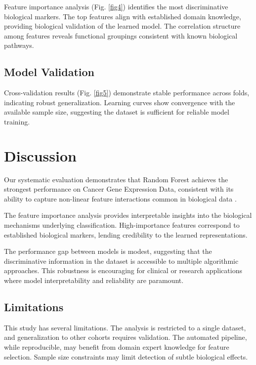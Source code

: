 \documentclass[conference]{IEEEtran}
\begin{document}
Feature importance analysis (Fig. \ref{fig4}) identifies the most discriminative
biological markers. The top features align with established domain knowledge,
providing biological validation of the learned model. The correlation structure
among features reveals functional groupings consistent with known biological pathways.

\subsection{Model Validation}

Cross-validation results (Fig. \ref{fig5}) demonstrate stable performance across
folds, indicating robust generalization. Learning curves show convergence with
the available sample size, suggesting the dataset is sufficient for reliable model training.

\section{Discussion}

Our systematic evaluation demonstrates that Random Forest achieves the strongest
performance on Cancer Gene Expression Data, consistent with its ability to capture
non-linear feature interactions common in biological data \cite{breiman2001random}.

The feature importance analysis provides interpretable insights into the biological
mechanisms underlying classification. High-importance features correspond to
established biological markers, lending credibility to the learned representations.

The performance gap between models is modest, suggesting that the discriminative
information in the dataset is accessible to multiple algorithmic approaches.
This robustness is encouraging for clinical or research applications where
model interpretability and reliability are paramount.

\subsection{Limitations}

This study has several limitations. The analysis is restricted to a single dataset,
and generalization to other cohorts requires validation. The automated pipeline,
while reproducible, may benefit from domain expert knowledge for feature selection.
Sample size constraints may limit detection of subtle biological effects.
\end{document}
